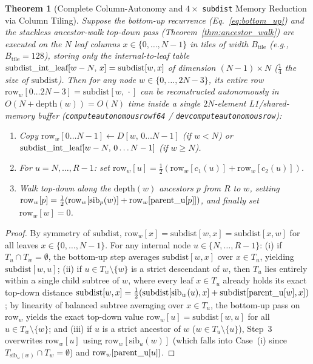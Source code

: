 \documentclass[11pt,a4paper]{article}
\makeatletter
\DeclareRobustCommand{\_}{\ifmmode\nfss@text{\textunderscore}\else\textunderscore\allowbreak\fi}
\newtheorem{theorem}{Theorem}[section]
\theoremstyle{definition}
\makeatother
\begin{document}
\begin{theorem}[Complete Column-Autonomy and $4\times$ \texttt{subdist} Memory Reduction via Column Tiling]
\label{thm:column_tiling}
Suppose the bottom-up recurrence (Eq.~\eqref{eq:bottom_up}) and the stackless ancestor-walk top-down pass (Theorem~\ref{thm:ancestor_walk}) are executed on the $N$ leaf columns $x \in \{0, \dots, N-1\}$ in tiles of width $B_{\text{tile}}$ (e.g., $B_{\text{tile}} = 128$), storing only the internal-to-leaf table $\text{subdist\_int\_leaf}[w - N, \, x] = \text{subdist}[w, x]$ of dimension $(N-1) \times N$ ($\frac{1}{4}$ the size of $\text{subdist}$). Then for any node $w \in \{0, \dots, 2N-3\}$, its entire row $\text{row}_w[0 \dots 2N-3] = \text{subdist}[w, \, \cdot]$ can be reconstructed autonomously in $O(N + \text{depth}(w)) = O(N)$ time inside a single $2N$-element L1/shared-memory buffer (\texttt{compute\_autonomous\_row\_f64} / \texttt{dev\_compute\_autonomous\_row}):
\begin{enumerate}
    \item Copy $\text{row}_w[0 \dots N-1] \leftarrow D[w, \, 0 \dots N-1]$ (if $w < N$) or $\text{subdist\_int\_leaf}[w - N, \, 0 \dots N-1]$ (if $w \ge N$).
    \item For $u = N, \dots, R-1$: set $\text{row}_w[u] = \frac{1}{2}(\text{row}_w[c_1(u)] + \text{row}_w[c_2(u)])$.
    \item Walk top-down along the $\text{depth}(w)$ ancestors $p$ from $R$ to $w$, setting $\text{row}_w[p] = \frac{1}{2}(\text{row}_w[\text{sib}_p(w)] + \text{row}_w[\text{parent\_u}[p]])$, and finally set $\text{row}_w[w] = 0$.
\end{enumerate}
\end{theorem}
\begin{proof}
By symmetry of $\text{subdist}$, $\text{row}_w[x] = \text{subdist}[w, x] = \text{subdist}[x, w]$ for all leaves $x \in \{0, \dots, N-1\}$. For any internal node $u \in \{N, \dots, R-1\}$: (i) if $T_u \cap T_w = \emptyset$, the bottom-up step averages $\text{subdist}[w, x]$ over $x \in T_u$, yielding $\text{subdist}[w, u]$; (ii) if $u \in T_w \setminus \{w\}$ is a strict descendant of $w$, then $T_u$ lies entirely within a single child subtree of $w$, where every leaf $x \in T_u$ already holds its exact top-down distance $\text{subdist}[w, x] = \frac{1}{2}(\text{subdist}[\text{sib}_w(u), x] + \text{subdist}[\text{parent\_u}[w], x])$; by linearity of balanced subtree averaging over $x \in T_u$, the bottom-up pass on $\text{row}_w$ yields the exact top-down value $\text{row}_w[u] = \text{subdist}[w, u]$ for all $u \in T_w \setminus \{w\}$; and (iii) if $u$ is a strict ancestor of $w$ ($w \in T_u \setminus \{u\}$), Step~3 overwrites $\text{row}_w[u]$ using $\text{row}_w[\text{sib}_u(w)]$ (which falls into Case~(i) since $T_{\text{sib}_u(w)} \cap T_w = \emptyset$) and $\text{row}_w[\text{parent\_u}[u]]$.
\end{proof}
\end{document}
